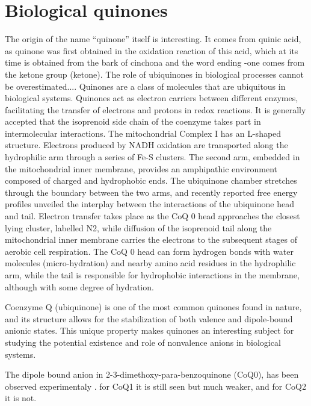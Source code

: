 \section{Biological quinones}
The origin of the name “quinone” itself is interesting. It comes from quinic acid, as quinone was first obtained in the oxidation reaction of this acid, which at its time is obtained from the bark of cinchona and the word ending -one comes from the ketone group (ketone)\cite{chen2024low,rusell1873quinone}. 
The role of ubiquinones in biological processes cannot be overestimated...\cite{ernster1995biochemical}.
Quinones are a class of molecules that are ubiquitous in biological systems. Quinones act as electron carriers between different enzymes, facilitating the transfer of electrons and protons in redox reactions. It is generally accepted
that the isoprenoid side chain of the coenzyme takes part in intermolecular interactions. The mitochondrial Complex I has
an L-shaped structure. Electrons produced by NADH oxidation are
transported along the hydrophilic arm through a series of Fe-S
clusters. The second arm, embedded in the mitochondrial inner
membrane, provides an amphipathic environment composed of
charged and hydrophobic ends. The ubiquinone chamber stretches
through the boundary between the two arms, and recently
reported free energy profiles unveiled the interplay between the
interactions of the ubiquinone head and tail. Electron transfer
takes place as the CoQ 0 head approaches the closest lying cluster,
labelled N2, while diffusion of the isoprenoid tail along the mitochondrial inner membrane carries the electrons to the subsequent
stages of aerobic cell respiration. The CoQ 0 head can form hydrogen
bonds with water molecules (micro-hydration) and nearby amino
acid residues in the hydrophilic arm, while the tail is responsible for hydrophobic interactions in the membrane, although with some degree of hydration.

Coenzyme Q (ubiquinone) is one of the most common quinones found in nature, and its structure allows for the stabilization of both valence and dipole-bound anionic states. This unique property makes quinones an interesting subject for studying the potential existence and role of nonvalence anions in biological systems.

The dipole bound anion in 2-3-dimethoxy-para-benzoquinone (CoQ0), has been observed experimentaly \cite{ameixa2023parent,west2014anion,pshenichnyuk2020ionizing, bull2015anion}. for CoQ1 it is still seen but much weaker, and for CoQ2 it is not. 

